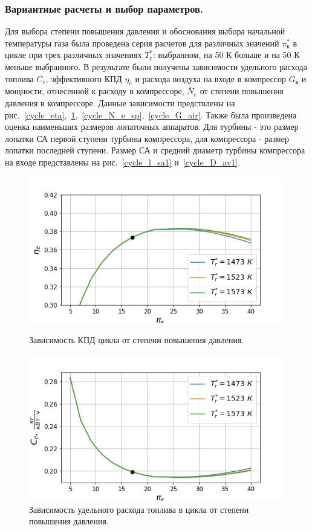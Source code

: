 \documentclass[a4paper,12pt]{article}
\begin{document}
    \subsubsection{Вариантные расчеты и выбор параметров.}
    Для выбора степени повышения давления и обоснования выбора начальной температуры газа была проведена серия расчетов
    для различных значений $\pi_к^*$ в цикле при трех различных значениях $T_г^*$: выбранном, на 50 К больше и на 50 К
    меньше выбранного.
    В результате были получены зависимости удельного расхода топлива $C_e$, эффективного КПД $\eta_e$ и расхода
    воздуха на входе в компрессор $G_в$ и мощности, отнесенной к расходу в компрессоре, $\bar{N}_e$
    от степени повышения давления в компрессоре.
    Данные зависимости предствлены на рис.~\ref{cycle_eta},~\ref{cycle_C_e},~\ref{cycle_N_e_sp},~\ref{cycle_G_air}.
    Также была произведена оценка наименьших размеров лопаточных аппаратов.
    Для турбины - это размер лопатки СА первой ступени турбины компрессора, для компрессора - размер лопатки
    последней ступени.
    Размер СА и средний диаметр турбины компрессора на входе представлены на рис.~\ref{cycle_l_sa1} и~\ref{cycle_D_av1}.

    \begin{figure}[h!]
        \centering
        \includegraphics[scale=0.8]{../plots/cycle_eta_e.png}
        \caption{Зависимость КПД цикла от степени повышения давления.}
        \label{cycle_eta}

        \includegraphics[scale=0.8]{../plots/cycle_C_e.png}
        \caption{Зависимость удельного расхода топлива в цикла от степени повышения давления.}
        \label{cycle_C_e}
    \end{figure}
\end{document}
